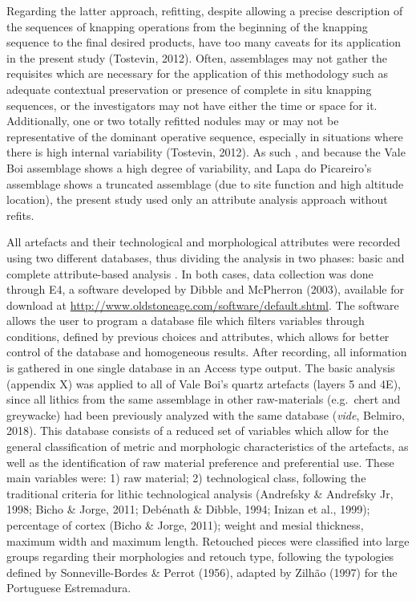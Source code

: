 \documentclass[12pt,twoside]{reedthesis}
\begin{document}
Regarding the latter approach, refitting, despite allowing a precise description of the sequences of knapping operations from the beginning of the knapping sequence to the final desired products, have too many caveats for its application in the present study (Tostevin, 2012). Often, assemblages may not gather the requisites which are necessary for the application of this methodology such as adequate contextual preservation or presence of complete in situ knapping sequences, or the investigators may not have either the time or space for it. Additionally, one or two totally refitted nodules may or may not be representative of the dominant operative sequence, especially in situations where there is high internal variability (Tostevin, 2012). As such , and because the Vale Boi assemblage shows a high degree of variability, and Lapa do Picareiro's assemblage shows a truncated assemblage (due to site function and high altitude location), the present study used only an attribute analysis approach without refits.

All artefacts and their technological and morphological attributes were recorded using two different databases, thus dividing the analysis in two phases: basic and complete attribute-based analysis .
In both cases, data collection was done through E4, a software developed by Dibble and McPherron (2003), available for download at \url{http://www.oldstoneage.com/software/default.shtml}. The software allows the user to program a database file which filters variables through conditions, defined by previous choices and attributes, which allows for better control of the database and homogeneous results. After recording, all information is gathered in one single database in an Access type output.
The basic analysis (appendix X) was applied to all of Vale Boi's quartz artefacts (layers 5 and 4E), since all lithics from the same assemblage in other raw-materials (e.g.~chert and greywacke) had been previously analyzed with the same database (\emph{vide}, Belmiro, 2018). This database consists of a reduced set of variables which allow for the general classification of metric and morphologic characteristics of the artefacts, as well as the identification of raw material preference and preferential use. These main variables were: 1) raw material; 2) technological class, following the traditional criteria for lithic technological analysis (Andrefsky \& Andrefsky Jr, 1998; Bicho \& Jorge, 2011; Debénath \& Dibble, 1994; Inizan et al., 1999); percentage of cortex (Bicho \& Jorge, 2011); weight and mesial thickness, maximum width and maximum length. Retouched pieces were classified into large groups regarding their morphologies and retouch type, following the typologies defined by Sonneville-Bordes \& Perrot (1956), adapted by Zilhão (1997) for the Portuguese Estremadura.
\end{document}
